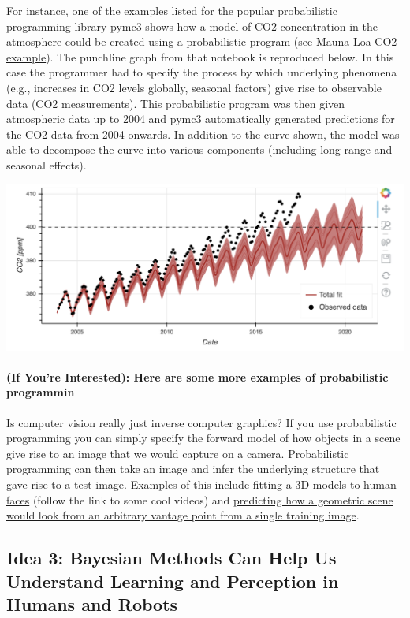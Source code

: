 \documentclass[assignment01_Solutions]{subfiles}
\begin{document}
For instance, one of the examples listed for the popular probabilistic programming library \href{https://docs.pymc.io/}{pymc3} shows how a model of CO2 concentration in the atmosphere could be created using a probabilistic program (see \href{https://docs.pymc.io/notebooks/GP-MaunaLoa.html}{Mauna Loa CO2 example}).  The punchline graph from that notebook is reproduced below.  In this case the programmer had to specify the process by which underlying phenomena (e.g., increases in CO2 levels globally, seasonal factors) give rise to observable data (CO2 measurements).  This probabilistic program was then given atmospheric data up to 2004 and pymc3 automatically generated predictions for the CO2 data from 2004 onwards.  In addition to the curve shown, the model was able to decompose the curve into various components (including long range and seasonal effects).

\begin{center}
\includegraphics[width=0.8\linewidth]{figures/maunaloa}
\end{center}

\paragraph{(If You're Interested): Here are some more examples of probabilistic programmin}
Is computer vision really just inverse computer graphics?  If you use probabilistic programming you can simply specify the forward model of how objects in a scene give rise to an image that we would capture on a camera. Probabilistic programming can then take an image and infer the underlying structure that gave rise to a test image.  Examples of this include fitting a  \href{http://mrkulk.github.io/www_cvpr15/}{3D models to human faces} (follow the link to some cool videos) and \href{https://science.sciencemag.org/content/sci/360/6394/1204.full.pdf}{predicting how a geometric scene would look from an arbitrary vantage point from a single training image}.


\subsection*{Idea 3: Bayesian Methods Can Help Us Understand Learning and Perception in Humans and Robots}
\end{document}
